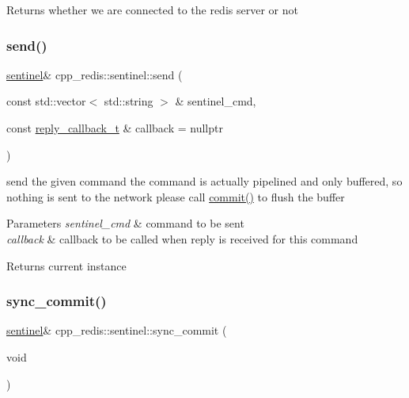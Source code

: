 \begin{DoxyReturn}{Returns}
whether we are connected to the redis server or not 
\end{DoxyReturn}
\mbox{\label{classcpp__redis_1_1sentinel_a0df522dbd7debda4e73f616a62d6f5ee}} 
\subsubsection{\texorpdfstring{send()}{send()}}
{\footnotesize\ttfamily \hyperlink{classcpp__redis_1_1sentinel}{sentinel}\& cpp\+\_\+redis\+::sentinel\+::send (\begin{DoxyParamCaption}\item[{const std\+::vector$<$ std\+::string $>$ \&}]{sentinel\+\_\+cmd,  }\item[{const \hyperlink{classcpp__redis_1_1sentinel_ae1a150ff8787208c47414397a061c9a7}{reply\+\_\+callback\+\_\+t} \&}]{callback = {\ttfamily nullptr} }\end{DoxyParamCaption})}

send the given command the command is actually pipelined and only buffered, so nothing is sent to the network please call \hyperlink{classcpp__redis_1_1sentinel_ad4f85d486499f82225b244f85091b31e}{commit()} to flush the buffer


\begin{DoxyParams}{Parameters}
{\em sentinel\+\_\+cmd} & command to be sent \\
\hline
{\em callback} & callback to be called when reply is received for this command \\
\hline
\end{DoxyParams}
\begin{DoxyReturn}{Returns}
current instance 
\end{DoxyReturn}
\mbox{\label{classcpp__redis_1_1sentinel_a8e4d231ac89510c337fe97fe9e642785}} 
\subsubsection{\texorpdfstring{sync\+\_\+commit()}{sync\_commit()}\hspace{0.1cm}{\footnotesize\ttfamily [1/2]}}
{\footnotesize\ttfamily \hyperlink{classcpp__redis_1_1sentinel}{sentinel}\& cpp\+\_\+redis\+::sentinel\+::sync\+\_\+commit (\begin{DoxyParamCaption}\item[{void}]{ }\end{DoxyParamCaption})}

